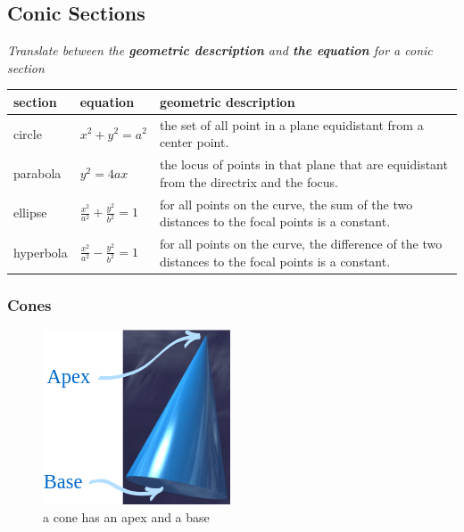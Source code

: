 \subsection[conic sections]{Conic Sections}

\textit{Translate between the \textbf{geometric description} and \textbf{the equation} for a conic section}

\vspace{1cm}

\begin{center}
    \begin{tabular}{|l|l|p{3.5cm}|}
        \hline
        section & equation & geometric description \\ \hline
        circle  & $x^2 + y^2 = a^2$ & the set of all point in a plane equidistant from a center point.\\ \hline
        parabola  & $y^2 = 4ax$ & the locus of points in that plane that are equidistant from the directrix and the focus.\\ \hline
        ellipse  & $\frac{x^2}{a^2} + \frac{y^2}{b^2} = 1$ & for all points on the curve, the sum of the two distances to the focal points is a constant.\\ \hline
        hyperbola & $\frac{x^2}{a^2} - \frac{y^2}{b^2} = 1$ & for all points on the curve, the difference of the two distances to the focal points is a constant.\\ \hline
        
    \end{tabular}
\end{center}



\subsubsection[cones]{Cones}

\begin{figure}[h!]
    \begin{center}
        \includegraphics[scale=.45]{./public/images/cone-parts}
        \caption{a cone has an apex and a base}
    \end{center}
\end{figure}

